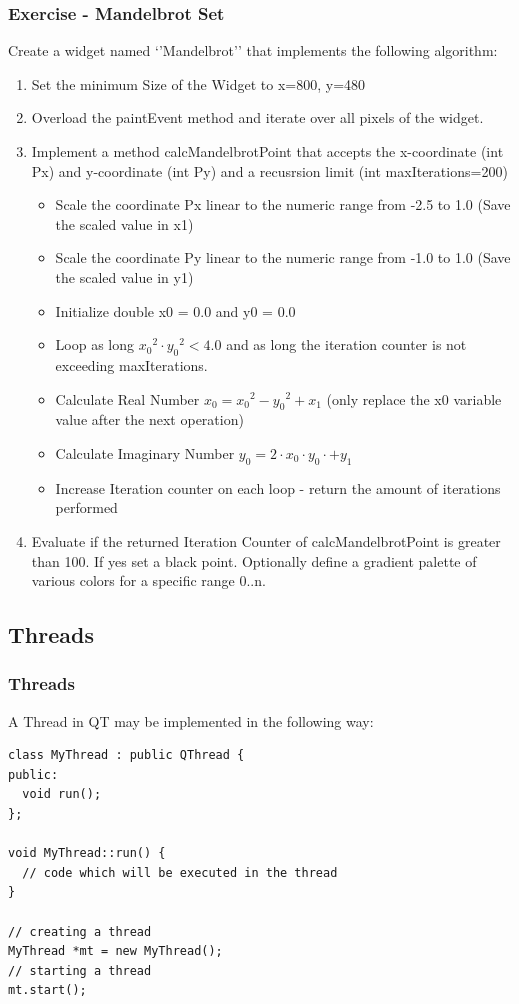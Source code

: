 \begin{frame}[fragile]
\frametitle{Exercise - Mandelbrot Set}
Create a widget named `'Mandelbrot'' that implements the following algorithm:
{\small
\begin{enumerate}
\item Set the minimum Size of the Widget to x=800, y=480
\item Overload the paintEvent method and iterate over all pixels of the widget. 
\item Implement a method calcMandelbrotPoint that accepts the x-coordinate (int Px) and y-coordinate (int Py) and a recusrsion limit (int maxIterations=200)
	\begin{itemize}
	\item Scale the coordinate Px linear to the numeric range from -2.5 to 1.0 (Save the scaled value in x1)
	\item Scale the coordinate Py linear to the numeric range from -1.0 to 1.0 (Save the scaled value in y1)
	\item Initialize double x0 = 0.0 and y0 = 0.0
	\item Loop as long ${x_0}^2 \cdot {y_0}^2 < 4.0$ and as long the iteration counter is not exceeding maxIterations.
	\item Calculate Real Number $x_0 = {x_0}^2 - {y_0}^2 + x_1$ (only replace the x0 variable value after the next operation)
	\item Calculate Imaginary Number $y_0 = 2 \cdot  x_0 \cdot y_0  \cdot + y_1$ 
	\item Increase Iteration counter on each loop - return the amount of iterations performed
	\end{itemize}
\item Evaluate if the returned Iteration Counter of calcMandelbrotPoint is greater than 100. If yes set a black point. Optionally define a gradient palette of various colors for a specific range 0..n.
\end{enumerate}
}
\end{frame}

\subsection{Threads}
\begin{frame}[fragile]
\frametitle{Threads}
A Thread in QT may be implemented in the following way:
{\tiny
\begin{lstlisting}
class MyThread : public QThread {
public:
  void run();
};

void MyThread::run() {
  // code which will be executed in the thread
}

// creating a thread
MyThread *mt = new MyThread();
// starting a thread
mt.start();
\end{lstlisting}
}
\end{frame}

